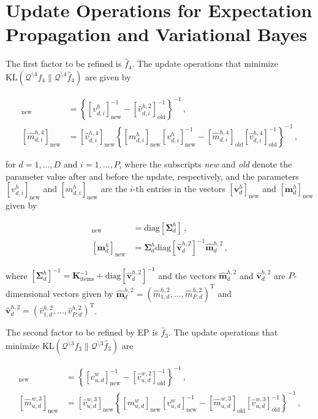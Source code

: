 \documentclass{article}
\begin{document}
\section{Update Operations for Expectation Propagation and Variational Bayes}

The first factor to be refined is $\hat{f}_4$. The update operations that minimize
$\text{KL}(\mathcal{Q}^{\setminus 4} f_4 \| \mathcal{Q}^{\setminus 4} \hat{f}_4)$ are given by

\begin{align}
[\hat{v}_{d,i}^{h,4}]_\text{new} & =
\left\{ [v_{d,i}^{h}]_\text{new}^{-1} - [\hat{v}_{d,i}^{h,2} ]_\text{old}^{-1}\right\}^{-1}\,,\\
[\hat{m}_{d,i}^{h,4}]_\text{new} & =
[\hat{v}_{d,i}^{h,4}]_\text{new} \left\{[ m_{d,i}^{h}]_\text{new} 
[v_{d,i}^{h}]_\text{new}^{-1} - [\hat{m}_{d,i}^{h,4}]_\text{old} [\hat{v}_{d,i}^{h,4}]_\text{old}^{-1}\right\}^{-1}\,,
\end{align}

for $d = 1,\ldots,D$ and $i = 1,\ldots,P$,
where the subscripts \emph{new} and \emph{old} denote the parameter value after and before the update, respectively, and
the parameters $[v_{d,i}^{h}]_\text{new}$ and $[ m_{d,i}^{h}]_\text{new}$ are the $i$-th entries in the vectors
$[\mathbf{v}_{d}^{h}]_\text{new}$ and $[\mathbf{m}_{d}^{h}]_\text{new}$ given by

\begin{align}
[\mathbf{v}_{d}^{h}]_\text{new} & = \text{diag}\left[ \bm \Sigma_d^h \right]\,,\label{eq:Sigmah} \\
[\mathbf{m}_{d}^{h}]_\text{new} & = \bm \Sigma_d^h \text{diag}[\hat{\mathbf{v}}_d^{h,2}]^{-1} \hat{\mathbf{m}}_d^{h,2}\label{eq:Sigma2h}\,,
\end{align}

where $[\bm \Sigma_d^h]^{-1} = \mathbf{K}^{-1}_\text{items} + \text{diag}[\hat{\mathbf{v}}_d^{h,2}]^{-1}$
and the vectors
$\hat{\mathbf{m}}_d^{h,2}$ and $\hat{\mathbf{v}}_d^{h,2}$ are $P$-dimensional vectors given by
$\hat{\mathbf{m}}_d^{h,2}=(\hat{m}_{1,d}^{h,2},\ldots,\hat{m}_{P,d}^{h,2})^\text{T}$ and
$\hat{\mathbf{v}}_d^{h,2}=(\hat{v}_{1,d}^{h,2},\ldots,\hat{v}_{P,d}^{h,2})^\text{T}$.

The second factor to be refined by EP is $\hat{f}_3$. The update operations that minimize
$\text{KL}(\mathcal{Q}^{\setminus 3} f_3 \| \mathcal{Q}^{\setminus 3} \hat{f}_3)$ are

\begin{align}
[\hat{v}_{u,d}^{w,3}]_\text{new} & =
\left\{ [v_{u,d}^{w}]_\text{new}^{-1} - [\hat{v}_{u,d}^{w,2} ]_\text{old}^{-1}\right\}^{-1}\,,\\
[\hat{m}_{u,d}^{w,3}]_\text{new} & =
[\hat{v}_{u,d}^{w,3}]_\text{new} \left\{[ m_{u,d}^{w}]_\text{new} 
[v_{u,d}^{w}]_\text{new}^{-1} - [\hat{m}_{u,d}^{w,3}]_\text{old} [\hat{v}_{u,d}^{w,3}]_\text{old}^{-1}\right\}^{-1}\,,
\end{align}
\end{document}
